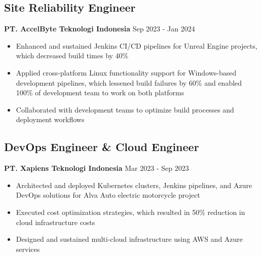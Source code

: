 \documentclass[11pt,a4paper]{article}
\newcommand{\company}[1]{\textbf{\color{primary}#1}}
\newcommand{\daterange}[1]{\color{secondary}#1}  %
\begin{document}
\subsection{Site Reliability Engineer}
\company{PT. AccelByte Teknologi Indonesia} \hfill \daterange{Sep 2023 - Jan 2024}
\begin{itemize}[leftmargin=*, itemsep=2pt]
                \item Enhanced and sustained Jenkins CI/CD pipelines for Unreal Engine projects, which decreased build times by 40\%
        \item Applied cross-platform Linux functionality support for Windows-based development pipelines, which lessened build failures by 60\% and enabled 100\% of development team to work on both platforms
    \item Collaborated with development teams to optimize build processes and deployment workflows
\end{itemize}

\subsection{DevOps Engineer \& Cloud Engineer}
\company{PT. Xapiens Teknologi Indonesia} \hfill \daterange{Mar 2023 - Sep 2023}
\begin{itemize}[leftmargin=*, itemsep=2pt]
    \item Architected and deployed Kubernetes clusters, Jenkins pipelines, and Azure DevOps solutions for Alva Auto electric motorcycle project
        \item Executed cost optimization strategies, which resulted in 50\% reduction in cloud infrastructure costs
        \item Designed and sustained multi-cloud infrastructure using AWS and Azure services
\end{itemize}
\end{document}

